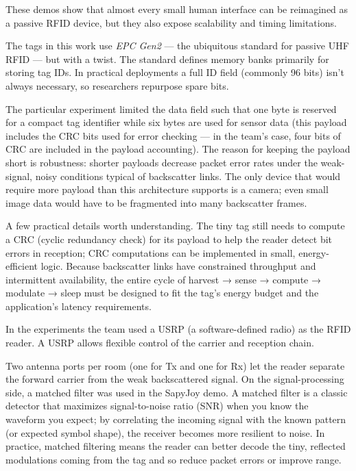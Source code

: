 These demos show that almost every small human interface can be reimagined as a passive RFID device, but they also expose scalability and timing limitations.

The tags in this work use \textit{EPC Gen2} — the ubiquitous standard for passive UHF RFID — but with a twist. The standard defines memory banks primarily for storing tag IDs. In practical deployments a full ID field (commonly 96 bits) isn’t always necessary, so researchers repurpose spare bits.

The particular experiment limited the data field such that one byte is reserved for a compact tag identifier while six bytes are used for sensor data (this payload includes the CRC bits used for error checking — in the team’s case, four bits of CRC are included in the payload accounting). The reason for keeping the payload short is robustness: shorter payloads decrease packet error rates under the weak-signal, noisy conditions typical of backscatter links. The only device that would require more payload than this architecture supports is a camera; even small image data would have to be fragmented into many backscatter frames.

A few practical details worth understanding. The tiny tag still needs to compute a CRC (cyclic redundancy check) for its payload to help the reader detect bit errors in reception; CRC computations can be implemented in small, energy-efficient logic. Because backscatter links have constrained throughput and intermittent availability, the entire cycle of harvest → sense → compute → modulate → sleep must be designed to fit the tag’s energy budget and the application’s latency requirements.

In the experiments the team used a USRP (a software-defined radio) as the RFID reader. A USRP allows flexible control of the carrier and reception chain.

Two antenna ports per room (one for Tx and one for Rx) let the reader separate the forward carrier from the weak backscattered signal. On the signal-processing side, a matched filter was used in the SapyJoy demo. A matched filter is a classic detector that maximizes signal-to-noise ratio (SNR) when you know the waveform you expect; by correlating the incoming signal with the known pattern (or expected symbol shape), the receiver becomes more resilient to noise. In practice, matched filtering means the reader can better decode the tiny, reflected modulations coming from the tag and so reduce packet errors or improve range.

